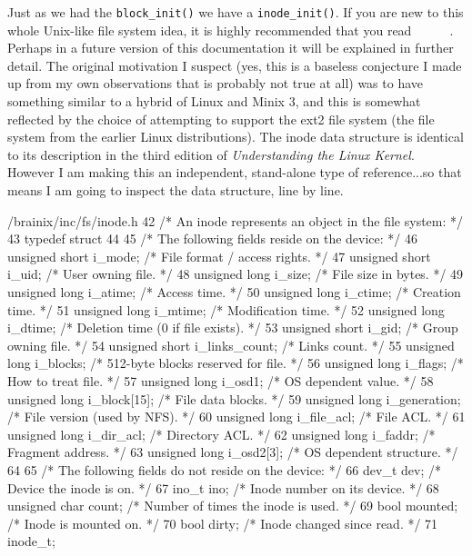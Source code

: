 Just as we had the \verb|block_init()| we have a \verb|inode_init()|. If you are new to this whole Unix-like file system idea, it is highly recommended that you read~\cite{1}~\cite{2}~\cite{3}~\cite{4}~\cite{5}~\cite{6}. Perhaps in a future version of this documentation it will be explained in further detail. The original motivation I suspect (yes, this is a baseless conjecture I made up from my own observations that is probably not true at all) was to have something similar to a hybrid of Linux and Minix 3, and this is somewhat reflected by the choice of attempting to support the ext2 file system (the file system from the earlier Linux distributions). The inode data structure is identical to its description in the third edition of \textit{Understanding the Linux Kernel}. However I am making this an independent, stand-alone type of reference...so that means I am going to inspect the data structure, line by line.\marginpar[inode\_t]{}
\begin{code}{/brainix/inc/fs/inode.h}
42 /* An inode represents an object in the file system: */
43 typedef struct
44 {
45      /* The following fields reside on the device: */
46      unsigned short i_mode;        /* File format / access rights.       */
47      unsigned short i_uid;         /* User owning file.                  */
48      unsigned long i_size;         /* File size in bytes.                */
49      unsigned long i_atime;        /* Access time.                       */
50      unsigned long i_ctime;        /* Creation time.                     */
51      unsigned long i_mtime;        /* Modification time.                 */
52      unsigned long i_dtime;        /* Deletion time (0 if file exists).  */
53      unsigned short i_gid;         /* Group owning file.                 */
54      unsigned short i_links_count; /* Links count.                       */
55      unsigned long i_blocks;       /* 512-byte blocks reserved for file. */
56      unsigned long i_flags;        /* How to treat file.                 */
57      unsigned long i_osd1;         /* OS dependent value.                */
58      unsigned long i_block[15];    /* File data blocks.                  */
59      unsigned long i_generation;   /* File version (used by NFS).        */
60      unsigned long i_file_acl;     /* File ACL.                          */
61      unsigned long i_dir_acl;      /* Directory ACL.                     */
62      unsigned long i_faddr;        /* Fragment address.                  */
63      unsigned long i_osd2[3];      /* OS dependent structure.            */
64 
65      /* The following fields do not reside on the device: */
66      dev_t dev;                    /* Device the inode is on.            */
67      ino_t ino;                    /* Inode number on its device.        */
68      unsigned char count;          /* Number of times the inode is used. */
69      bool mounted;                 /* Inode is mounted on.               */
70      bool dirty;                   /* Inode changed since read.          */
71 } inode_t;
\end{code}
